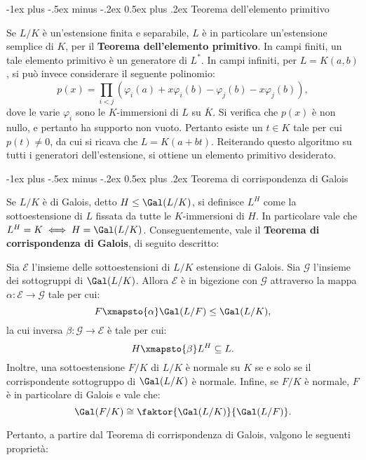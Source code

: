 \documentclass[10pt,landscape]{article}
\makeatletter
\renewcommand{\section}{\@startsection{section}{1}{0mm}%
	{-1ex plus -.5ex minus -.2ex}%
	{0.5ex plus .2ex}%
	{\normalfont\large\bfseries}}
\makeatother
\begin{document}
\begin{multicols}{3}
		\section{Teorema dell'elemento primitivo}
		
		Se $L / K$ è un'estensione finita e separabile,
		$L$ è in particolare un'estensione semplice di
		$K$, per il \textbf{Teorema dell'elemento primitivo}.
		In campi finiti, un tale elemento primitivo è
		un generatore di $L^*$. In campi infiniti, per
		$L = K(a, b)$,
		si può invece considerare il seguente polinomio:
		\[ p(x) = \prod_{i < j} (\varphi_i(a) + x \varphi_i(b) - \varphi_j(b) - x \varphi_j(b)), \]
		dove le varie $\varphi_i$ sono le $K$-immersioni di
		$L$ su $\overline{K}$.
		Si verifica che $p(x)$ è non nullo, e pertanto
		ha supporto non vuoto. Pertanto esiste un $t \in K$ tale
		per cui $p(t) \neq 0$, da cui si ricava che
		$L = K(a + bt)$. Reiterando questo algoritmo su
		tutti i generatori dell'estensione, si ottiene
		un elemento primitivo desiderato.
		
		\section{Teorema di corrispondenza di Galois}
		
		
		Se $L / K$ è di Galois, detto $H \leq \Gal(L / K)$,
		si definisce $L^H$ come la sottoestensione di $L$
		fissata da tutte le $K$-immersioni di $H$.
		In particolare vale che $L^H = K \iff H = \Gal(L / K)$.
		Conseguentemente, vale il \textbf{Teorema di corrispondenza di Galois}, di seguito descritto:
		
		\begin{theorem}
			Sia $\mathcal{E}$ l'insieme delle sottoestensioni
			di $L / K$ estensione di Galois. Sia
			$\mathcal{G}$ l'insieme dei sottogruppi di
			$\Gal(L / K)$. Allora $\mathcal{E}$ è
			in bigezione con $\mathcal{G}$ attraverso
			la mappa $\alpha : \mathcal{E} \to \mathcal{G}$
			tale per cui:
			\[ F \xmapsto{\alpha} \Gal(L / F) \leq
			\Gal(L / K), \]
			la cui inversa $\beta : \mathcal{G} \to \mathcal{E}$
			è tale per cui:
			\[ H \xmapsto{\beta} L^H \subseteq L. \]
			Inoltre, una sottoestensione $F / K$ di
			$L / K$ è normale su $K$ se e solo se
			il corrispondente sottogruppo di $\Gal(L / K)$
			è normale. Infine, se $F / K$ è normale,
			$F$ è in particolare di Galois e vale che:
			\[ \Gal(F / K) \cong \faktor{\Gal(L / K)}{\Gal(L / F)}. \]
		\end{theorem}
		
		Pertanto, a partire dal Teorema di corrispondenza di Galois, valgono le seguenti proprietà:


\end{multicols}
\end{document}
